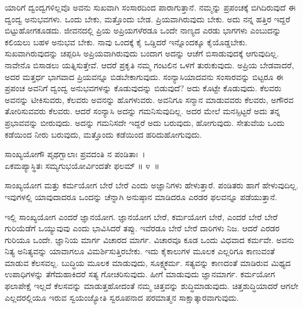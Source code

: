 ಯಾರಿಗೆ ದ್ವಂದ್ವಗಳಿಲ್ಲವೊ ಅವನು ಸುಖವಾಗಿ ಸಂಸಾರದಿಂದ ಪಾರಾಗುತ್ತಾನೆ. ನಮ್ಮನ್ನು ಪ್ರಪಂಚಕ್ಕೆ ಬಿಗಿದಿರುವುದೆ ಈ ದ್ವಂದ್ವ ಅನುಭವಗಳು. ಒಂದು ಬೇಕು, ಮತ್ತೊಂದು ಬೇಡ. ಪ್ರಿಯವಾಗಿರುವುದು ಬೇಕು. ಅದು ನನ್ನ ಹತ್ತಿರ ಇದ್ದರೆ ಬಿಟ್ಟುಹೋಗಕೂಡದು. ಜೀವನದಲ್ಲಿ ಪ್ರಿಯ ಅಪ್ರಿಯಗಳೆರಡೂ ಒಂದೇ ನಾಣ್ಯದ ಎರಡು ಭಾಗಗಳು ಎಂಬುದನ್ನು ಕಲಿಯಲು ಬಹಳ ಅನುಭವ ಬೇಕು. ನಾವು ಒಂದಕ್ಕೆ ಕೈ ಒಡ್ಡಿದರೆ ಇನ್ನೊಂದಕ್ಕೂ ಕೈಯೊಡ್ಡಬೇಕು. ಸುಖವಾಗಿರುವುದನ್ನು ಚಪ್ಪರಿಸಿ ಅಪ್ರಿಯವಾಗಿರುವುದು ಬಂದಾಗ ಅದನ್ನು ಆಚೆಗೆ ಬಿಸಾಡುವುದಕ್ಕೆ ಆಗುವುದಿಲ್ಲ. ನಾವೇನೊ ಬಿಸಾಡಲು ಯತ್ನಿಸುತ್ತೇವೆ. ಆದರೆ ಪ್ರಕೃತಿ ನಮ್ಮ ಗಂಟಲಿನ ಒಳಗೆ ತುರುಕುವುದು. ಅಪ್ರಿಯ ಬೇಡವಾದರೆ, ಅದರ ಮತ್ತರ್ಧ ಭಾಗವಾದ ಪ್ರಿಯವನ್ನೂ ಬಿಡಬೇಕಾಗುವುದು. ಸಂನ್ಯಾಸಿಯಾದವನು ಸಂಸಾರವನ್ನು ಬಿಟ್ಟರೂ ಈ ಪ್ರಪಂಚ ಅವನಿಗೆ ದ್ವಂದ್ವ ಅನುಭವಗಳನ್ನು ಕೊಡುವುದನ್ನು ಬಿಡುವುದೆ? ಅದು ಕೊಟ್ಟೇ ಕೊಡುವುದು. ಕೆಲವರು ಅವನನ್ನು ಟೀಕಿಸುವರು, ಕೆಲವರು ಅವನನ್ನು ಹೊಗಳುವರು. ಅವನಿಗೂ ಸನ್ಮಾನ ಮಾಡುವವರು ಕೆಲವರು, ಅಗೌರವ ತೋರಿಸುವವರು ಕೆಲವರು. ಆದರೆ ಸಂನ್ಯಾಸಿ ಅದನ್ನು ಗಮನಿಸುವುದಿಲ್ಲ. ಅದರ ಮೇಲೆ ಮನಸ್ಸಿಟ್ಟರೆ ಅದು ತನ್ನ ಪ್ರಭಾವವನ್ನು ಬೀರುವುದು. ಅದನ್ನು ಗಮನಿಸದೇ ಇದ್ದರೆ ಅದು ಬರುವುದು, ಹೋಗುವುದು. ಸೇತುವೆಯ ಒಂದು ಕಡೆಯಿಂದ ನೀರು ಬರುವುದು, ಮತ್ತೊಂದು ಕಡೆಯಿಂದ ಹರಿದುಹೋಗುವುದು.

\begin{shloka}
ಸಾಂಖ್ಯಯೋಗೌ ಪೃಥಗ್ಬಾಲಾಃ ಪ್ರವದಂತಿ ನ ಪಂಡಿತಾಃ~।\\ಏಕಮಪ್ಯಾಸ್ಥಿತಃ ಸಮ್ಯಗುಭಯೋರ್ವಿಂದತೇ ಫಲಮ್ \hfill॥ ೪~॥
\end{shloka}

\begin{artha}
ಸಾಂಖ್ಯಯೋಗ ಮತ್ತು ಕರ್ಮಯೋಗ ಬೇರೆ ಬೇರೆ ಎಂದು ಅಜ್ಞಾನಿಗಳು ಹೇಳುತ್ತಾರೆ. ಪಂಡಿತರು ಹಾಗೆ ಹೇಳುವುದಿಲ್ಲ. ಇವುಗಳಲ್ಲಿ ಯಾವುದಾದರೂ ಒಂದನ್ನು ಚೆನ್ನಾಗಿ ಅನುಷ್ಠಾನ ಮಾಡಿದರೂ ಎರಡರ ಫಲವನ್ನೂ ಪಡೆಯುತ್ತಾನೆ.
\end{artha}

ಇಲ್ಲಿ ಸಾಂಖ್ಯಯೋಗ ಎಂದರೆ ಜ್ಞಾನಯೋಗ. ಜ್ಞಾನಯೋಗ ಬೇರೆ, ಕರ್ಮಯೋಗ ಬೇರೆ, ಎಂದರೆ ಬೇರೆ ಬೇರೆ ಗುರಿಯೆಡೆಗೆ ಒಯ್ಯುವುವು ಎಂದು ಭಾವಿಸಿದರೆ ತಪ್ಪು. ಇವೆರಡೂ ಬೇರೆ ಬೇರೆ ದಾರಿಗಳು ನಿಜ. ಆದರೆ ಎರಡರ ಗುರಿಯೂ ಒಂದೇ. ಜ್ಞಾನಿಯ ಮಾರ್ಗ ವಿಚಾರದ ಮಾರ್ಗ. ವಿಚಾರವೂ ಕೂಡ ಒಂದು ವಿಧವಾದ ಕರ್ಮವೇ. ಅವನು ನಿತ್ಯ ಅನಿತ್ಯವನ್ನು ಯಾವಾಗಲೂ ವಿಮರ್ಶಿಸುತ್ತಿರಬೇಕು. ಇದು ಕೈಕಾಲುಗಳ ಮೂಲಕ ಎಲ್ಲರಿಗೂ ಕಾಣುವಂತೆ ಮಾಡುವ ಕೆಲಸವಲ್ಲ. ಬುದ್ಧಿಯ ಮೂಲಕ ಮಾಡುವುದು, ಸೂಕ್ಷ್ಮಕರ್ಮ. ಸತ್ಯವನ್ನು ಕಾಣದಂತೆ ಮಾಡಿರುವ ಮಿಥ್ಯದ ಉಪಾಧಿಗಳನ್ನು ತೆಗೆದುಹಾಕಿದರೆ ಸತ್ಯ ಗೋಚರಿಸುವುದು. ಹೀಗೆ ಮಾಡುವುದು ಜ್ಞಾನಮಾರ್ಗ. ಕರ್ಮಯೋಗ ಫಲಾಪೇಕ್ಷೆ ಇಲ್ಲದೆ ಕೆಲಸವನ್ನು ಮಾಡುತ್ತ\break ಹೋದಂತೆ ನಮ್ಮ ಚಿತ್ತವನ್ನು ಶುದ್ಧಿಮಾಡುವುದು. ಚಿತ್ತಶುದ್ಧಿಯಾದರೆ ಆಗಲೇ ಎಲ್ಲದರಲ್ಲಿಯೂ ಇರುವ ಸ್ವಯಂಜ್ಯೋತಿ ಸ್ವರೂಪನಾದ ಪರಮಾತ್ಮನ ಸಾಕ್ಷಾತ್ಕಾರವಾಗುವುದು.

